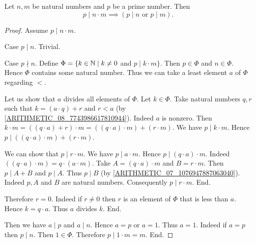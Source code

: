 \documentclass[10pt]{article}
\begin{document}
  \begin{forthel}
    \begin{proposition}
      Let $n, m$ be natural numbers and $p$ be a prime number.
      Then \[ p \mid n \cdot m \implies (\text{$p \mid n$ or $p \mid m$}). \]
    \end{proposition}
    \begin{proof}
      Assume $p \mid n \cdot m$.

      Case $p \mid n$. Trivial.

      Case $p \nmid n$.
        Define $\Phi = \{ k \in \mathbb{N} \mid k \neq 0$ and $p \mid k \cdot m \}$.
        Then $p \in \Phi$ and $n \in \Phi$.
        Hence $\Phi$ contains some natural number.
        Thus we can take a least element $a$ of $\Phi$ regarding ${<}$.

        Let us show that $a$ divides all elements of $\Phi$.
          Let $k \in \Phi$.
          Take natural numbers $q, r$ such that $k = (a \cdot q) + r$ and
          $r < a$ (by \cref{ARITHMETIC_08_7743986617810944}).
          Indeed $a$ is nonzero.
          Then $k \cdot m
            = ((q \cdot a) + r) \cdot m
            = ((q \cdot a) \cdot m) + (r \cdot m)$.
          We have $p \mid k \cdot m$.
          Hence $p \mid ((q \cdot a) \cdot m) + (r \cdot m)$.

          We can show that $p \mid r \cdot m$.
            We have $p \mid a \cdot m$.
            Hence $p \mid (q \cdot a) \cdot m$.
            Indeed $((q \cdot a) \cdot m) = q \cdot (a \cdot m)$. %
            Take $A = (q \cdot a) \cdot m$ and $B = r \cdot m$. %
            Then $p \mid A + B$ and $p \mid A$.
            Thus $p \mid B$ (by \cref{ARITHMETIC_07_1076947887063040}).
            Indeed $p, A$ and $B$ are natural numbers.
            Consequently $p \mid r \cdot m$.
          End.

          Therefore $r = 0$.
          Indeed if $r \neq 0$ then $r$ is an element of $\Phi$ that is less than $a$.
          Hence $k = q \cdot a$.
          Thus $a$ divides $k$.
        End.

        Then we have $a \mid p$ and $a \mid n$.
        Hence $a = p$ or $a = 1$.
        Thus $a = 1$.
        Indeed if $a = p$ then $p \mid n$.
        Then $1 \in \Phi$.
        Therefore $p \mid 1 \cdot m = m$.
      End.
    \end{proof}
  \end{forthel}
\end{document}
